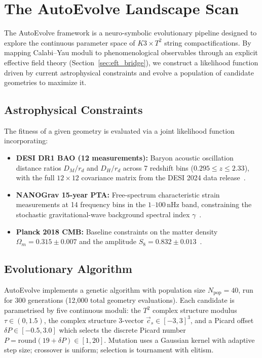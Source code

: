 \section{The AutoEvolve Landscape Scan}

The AutoEvolve framework is a neuro-symbolic evolutionary pipeline designed to explore the continuous parameter space of $K3 \times T^2$ string compactifications. By mapping Calabi--Yau moduli to phenomenological observables through an explicit effective field theory (Section~\ref{sec:eft_bridge}), we construct a likelihood function driven by current astrophysical constraints and evolve a population of candidate geometries to maximize it.

\subsection{Astrophysical Constraints}
The fitness of a given geometry is evaluated via a joint likelihood function incorporating:
\begin{itemize}
    \item \textbf{DESI DR1 BAO (12 measurements):} Baryon acoustic oscillation distance ratios $D_M/r_d$ and $D_H/r_d$ across 7 redshift bins ($0.295 \leq z \leq 2.33$), with the full $12 \times 12$ covariance matrix from the DESI 2024 data release~\cite{DESI2024}.
    \item \textbf{NANOGrav 15-year PTA:} Free-spectrum characteristic strain measurements at 14 frequency bins in the $1$--$100$\,nHz band, constraining the stochastic gravitational-wave background spectral index $\gamma$~\cite{NANOGrav2023}.
    \item \textbf{Planck 2018 CMB:} Baseline constraints on the matter density $\Omega_m = 0.315 \pm 0.007$ and the amplitude $S_8 = 0.832 \pm 0.013$~\cite{Planck2020}.
\end{itemize}

\subsection{Evolutionary Algorithm}
AutoEvolve implements a genetic algorithm with population size $N_{\text{pop}} = 40$, run for 300 generations (12{,}000 total geometry evaluations). Each candidate is parametrised by five continuous moduli: the $T^2$ complex structure modulus $\tau \in (0, 1.5)$, the complex structure 3-vector $\vec{c}_s \in [-3, 3]^3$, and a Picard offset $\delta P \in [-0.5, 3.0]$ which selects the discrete Picard number $P = \text{round}(19 + \delta P) \in [1, 20]$. Mutation uses a Gaussian kernel with adaptive step size; crossover is uniform; selection is tournament with elitism.

